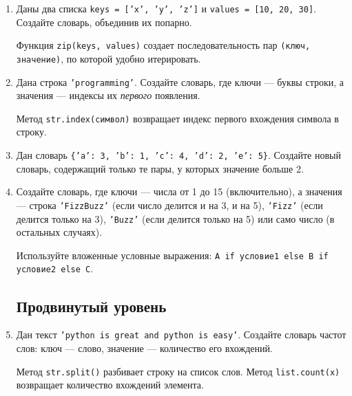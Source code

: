 \documentclass[a4,12pt]{article}
\theoremstyle{remark}
\begin{document}
\begin{enumerate}
    \item Даны два списка \texttt{keys = ['x', 'y', 'z']} и
    \texttt{values = [10, 20, 30]}.
    Создайте словарь, объединив их попарно.

    \begin{exercisehint}
        Функция \texttt{zip(keys, values)} создает последовательность
        пар \texttt{(ключ, значение)}, по которой удобно итерировать.
    \end{exercisehint}

    \item Дана строка \texttt{'programming'}.
    Создайте словарь, где ключи — буквы строки,
    а значения — индексы их \emph{первого} появления.

    \begin{exercisehint}
        Метод \texttt{str.index(символ)} возвращает индекс первого вхождения
        символа в строку.
    \end{exercisehint}

    \item Дан словарь \texttt{\{'a': 3, 'b': 1, 'c': 4, 'd': 2, 'e': 5\}}.
    Создайте новый словарь, содержащий только те пары,
    у которых значение больше 2.

    \item Создайте словарь, где ключи — числа от 1 до 15 (включительно),
    а значения — строка \texttt{'FizzBuzz'} (если число делится и на 3, и на 5),
    \texttt{'Fizz'} (если делится только на 3), \texttt{'Buzz'}
    (если делится только на 5) или само число (в остальных случаях).

    \begin{exercisehint}
        Используйте вложенные условные выражения:
        \texttt{A if условие1 else B if условие2 else C}.
    \end{exercisehint}

    \subsection*{Продвинутый уровень}

    \item Дан текст \texttt{'python is great and python is easy'}.
    Создайте словарь частот слов: ключ — слово, значение — количество его вхождений.

    \begin{exercisehint}
        Метод \texttt{str.split()} разбивает строку на список слов.
        Метод \texttt{list.count(x)} возвращает количество вхождений элемента.
    \end{exercisehint}


\end{enumerate}
\end{document}
